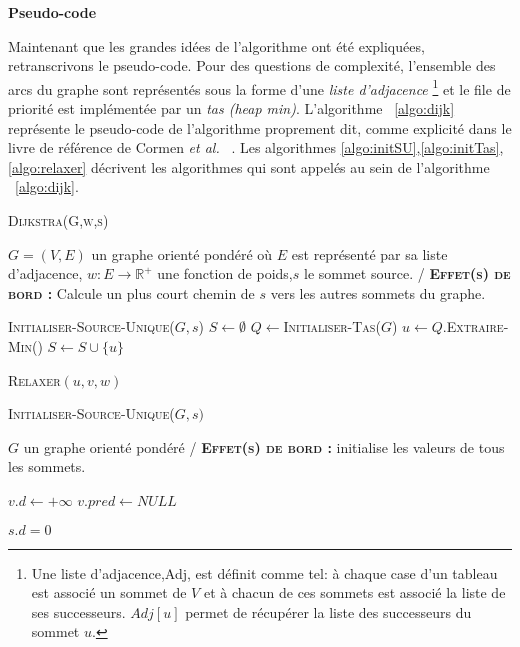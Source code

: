 
\noindent \textbf{Pseudo-code}

Maintenant que les grandes idées de l'algorithme ont été expliquées, retranscrivons le pseudo-code. Pour des questions de complexité, l'ensemble des arcs du graphe sont représentés sous la forme d'une \textit{liste d'adjacence} \footnote{Une liste d'adjacence,Adj, est définit comme tel: à chaque case d'un tableau est associé un sommet de $V$ et à chacun de ces sommets est associé la liste de ses successeurs. $Adj[u]$ permet de récupérer la liste des successeurs du sommet $u$. } et le file de priorité est implémentée par un \textit{tas (heap min)}. L'algorithme ~\ref{algo:dijk} représente le pseudo-code de l'algorithme proprement dit, comme explicité dans le livre de référence de Cormen \emph{et al.} ~\cite{Cormen:2009:IA:580470}. Les algorithmes \ref{algo:initSU},\ref{algo:initTas},\ref{algo:relaxer} décrivent les algorithmes qui sont appelés au sein de l'algorithme ~\ref{algo:dijk}.

\begin{algorithm}
	\caption{\textsc {Dijkstra(G,w,s)}}
	 \label{algo:dijk}
	\begin{algorithmic}[1]
		\REQUIRE $G = (V,E)$ un graphe orienté pondéré où $E$ est représenté par sa liste d'adjacence, $w: E \rightarrow \mathbb{R}^{+}$ une fonction de poids,$s$ le sommet source.
		\ENSURE / \textbf{\textsc{Effet(s) de bord :}} Calcule un plus court chemin de $s$ vers les autres sommets du graphe.
		
		\STATE \textsc{Initialiser-Source-Unique}($G,s$)
		\STATE $S \leftarrow \emptyset$
		\STATE $Q \leftarrow $\textsc{Initialiser-Tas}($G$)
			\STATE $u \leftarrow Q.$\textsc{Extraire-Min}()
			\STATE $S \leftarrow S \cup \{ u \} $
			
				\STATE \textsc{Relaxer}$(u,v,w)$
			\ENDFOR
		\ENDWHILE
	
			
\end{algorithmic}
		
\end{algorithm}



\begin{algorithm}
	\caption{\textsc {Initialiser-Source-Unique}($G,s)$}
	 \label{algo:initSU}
	\begin{algorithmic}[1]
		\REQUIRE $G$ un graphe orienté pondéré
		\ENSURE / \textbf{\textsc{Effet(s) de bord :}} initialise les valeurs de tous les sommets.
		
			\STATE $v.d \leftarrow +\infty$
			\STATE $v.pred \leftarrow NULL$
		\ENDFOR
		
		\STATE $s.d = 0$
	
			
\end{algorithmic}
		
\end{algorithm}

